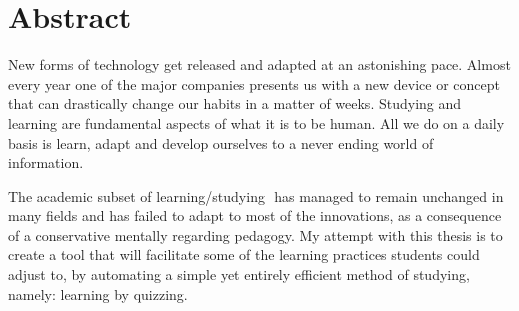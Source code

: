 \chapter*{Abstract}
\label{cha:abstract}

New forms of technology get released and adapted at an astonishing pace. Almost
every year one of the major companies presents us with a new device or concept
that can drastically change our habits in a matter of weeks.
Studying and learning are fundamental aspects of what it is to be human. All we do
on a daily basis is learn, adapt and develop ourselves to a never ending world of
information.

The academic subset of learning/studying ​ has managed to remain unchanged in
many fields and has failed to adapt to most of the innovations, as a consequence of
a conservative mentally regarding pedagogy.
My attempt with this thesis is to create a tool that will facilitate some of the learning
practices students could adjust to, by automating a simple yet entirely efficient
method of studying, namely: learning by quizzing.